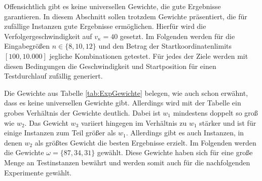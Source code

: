 \documentclass[german,version-2019-11]{uzl-thesis}
\begin{document}
Offensichtlich gibt es keine universellen Gewichte, die gute Ergebnisse garantieren. In diesem Abschnitt sollen trotzdem Gewichte präsentiert, die für zufällige Instanzen gute Ergebnisse ermöglichen. Hierfür wird die Verfolgergeschwindigkeit auf $v_{\kappa}=40$ gesetzt. Im Folgenden  werden für die Eingabegrößen $n\in\{8,10,12\}$ und den Betrag der Startkoordinatenlimits $[100,10.000]$ jegliche Kombinationen getestet. Für jedes der Ziele werden mit diesen Bedingungen die Geschwindigkeit und Startposition für einen Testdurchlauf zufällig generiert.
\begin{table}[htpb]
\centering
{}
\caption{Der jeweils beste Gewichte-Kandidat von $1.000$ zufälligen Gewichten für $100$ zufällige Instanzen.}
\label{tab:ExpGewichte}
\end{table} 

Die Gewichte aus Tabelle \ref{tab:ExpGewichte} belegen, wie auch schon erwähnt, dass es keine universellen Gewichte gibt. Allerdings wird mit der Tabelle ein grobes Verhältnis der Gewichte deutlich. Dabei ist $w_1$ mindestens doppelt so groß wie $w_2$. Das Gewicht $w_3$ variiert hingegen im Verhältnis zu $w_1$ stärker und ist für einige Instanzen zum Teil größer als $w_1$. Allerdings gibt es auch Instanzen, in denen $w_2$ als größtes Gewicht die besten Ergebnisse erzielt. Im Folgenden werden die Gewichte $\omega = \{87,34,31\}$ gewählt. Diese Gewichte haben sich für eine große Menge an Testinstanzen bewährt und werden somit auch für die nachfolgenden Experimente gewählt.
\end{document}

